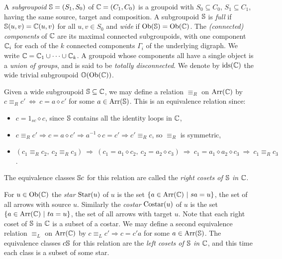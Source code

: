 \medskip {} 
A \emph{subgroupoid} $\mathbb{S}=(S_1,S_0)$ of $\mathbb{C}=(C_1,C_0)$ 
is a groupoid with $S_0 \subseteq C_0$, $S_1 \subseteq C_1$, 
having the same source, target and composition. 
A subgroupoid $\mathbb{S}$ is \emph{full}  
if $\mathbb{S}(u,v) = \mathbb{C}(u,v)$ for all $u,v \in S_0$ 
and \emph{wide}  
if $\mathrm{Ob}(\mathbb{S}) = \mathrm{Ob}(\mathbb{C})$. 
The \emph{(connected) components} of $\mathbb{C}$ are its maximal 
connected subgroupoids,  
with one component $\mathbb{C}_i$ for each of the $k$ connected components 
$\Gamma_i$ of the underlying digraph. 
We write $\mathbb{C} = \mathbb{C}_1 \cup \cdots \cup \mathbb{C}_k$.  
A groupoid whose components all have a single object is a 
\emph{union of groups},  
and is said to be \emph{totally disconnected}. 
We denote by $\mathrm{ids}(\mathbb{C})$ the wide trivial subgroupoid $\mathbb{O}(\mathrm{Ob}(\mathbb{C}))$. 

\medskip
Given a wide subgroupoid $\mathbb{S} \subseteq \mathbb{C}$, 
we may define a relation $\equiv_R$ on $\mathrm{Arr}(\mathbb{C})$ by 
$c \equiv_R c' ~\Leftrightarrow~ c = a \diamond c'$ 
for some $a \in \mathrm{Arr}(\mathbb{S})$. 
This is an equivalence relation since: 
\begin{itemize}
\item
$c = 1_{sc} \diamond c$, since $\mathbb{S}$ contains 
all the identity loops in $\mathbb{C}$,  
\item
$c \equiv_R c' \Rightarrow c=a \diamond c' \Rightarrow a^{-1}\diamond c=c' 
               \Rightarrow c' \equiv_R c$, so $\equiv_R$ is symmetric, 
\item
$(c_1 \equiv_R c_2,~ c_2 \equiv_R c_3) 
 ~\Rightarrow~ (c_1=a_1 \diamond c_2,~ c_2=a_2 \diamond c_3) 
 ~\Rightarrow~ c_1=a_1 \diamond a_2 \diamond c_3 
 ~\Rightarrow~ c_1 \equiv_R c_3$. 
\end{itemize} 
The equivalence classes $\mathbb{S} c$ for this relation are called the 
\emph{right cosets of $\mathbb{S}$ in $\mathbb{C}$}. 

\medskip
For $u \in \mathrm{Ob}(\mathbb{C})$ the \emph{star} $\mathrm{Star}(u)$ of $u$ is the set 
$\{a \in \mathrm{Arr}(\mathbb{C}) ~|~ sa=u\}$, the set of all arrows with source $u$. 
Similarly the \emph{costar} $\mathrm{Costar}(u)$ of $u$ is the set 
$\{a \in \mathrm{Arr}(\mathbb{C}) ~|~ ta=u\}$, the set of all arrows with target $u$.
Note that each right coset of $\mathbb{S}$ in $\mathbb{C}$ is a subset of a costar. 
We may define a second equivalence relation $\equiv_L$ on $\mathrm{Arr}(\mathbb{C})$ by 
$c \equiv_L c' \Rightarrow c = c'a$ for some $a \in \mathrm{Arr}(\mathbb{S})$. 
The equivalence classes $c\mathbb{S}$ for this relation are the 
\emph{left cosets of $\mathbb{S}$ in $\mathbb{C}$}, 
and this time each class is a subset of some star. 

